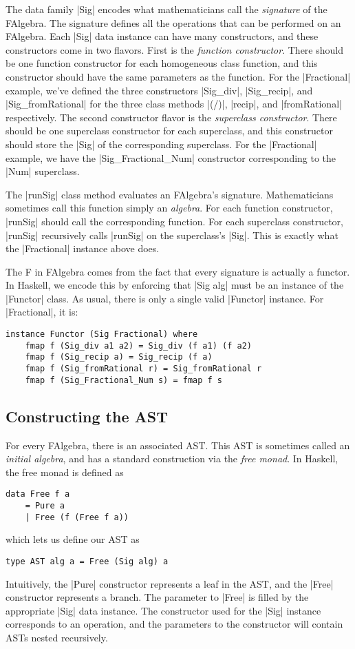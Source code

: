 \documentclass[preprint]{sigplanconf}
\theoremstyle{definition}
\begin{document}
The data family |Sig| encodes what mathematicians call the \emph{signature} of the FAlgebra.
The signature defines all the operations that can be performed on an FAlgebra.
Each |Sig| data instance can have many constructors,
and these constructors come in two flavors.
First is the \emph{function constructor}.
There should be one function constructor for each homogeneous class function, and
this constructor should have the same parameters as the function.
For the |Fractional| example, we've defined the three constructors |Sig_div|, |Sig_recip|, and |Sig_fromRational| for the three class methods |(/)|, |recip|, and |fromRational| respectively.
The second constructor flavor is the \emph{superclass constructor}.
There should be one superclass constructor for each superclass, and
this constructor should store the |Sig| of the corresponding superclass.
For the |Fractional| example, we have the |Sig_Fractional_Num| constructor corresponding to the |Num| superclass.

The |runSig| class method evaluates an FAlgebra's signature.
Mathematicians sometimes call this function simply an \emph{algebra}.
For each function constructor, |runSig| should call the corresponding function.
For each superclass constructor, |runSig| recursively calls |runSig| on the superclass's |Sig|.
This is exactly what the |Fractional| instance above does.

The F in FAlgebra comes from the fact that every signature is actually a functor.
In Haskell, we encode this by enforcing that |Sig alg| must be an instance of the |Functor| class.
As usual, there is only a single valid |Functor| instance.
For |Fractional|, it is:
\begin{lstlisting}
instance Functor (Sig Fractional) where
    fmap f (Sig_div a1 a2) = Sig_div (f a1) (f a2)
    fmap f (Sig_recip a) = Sig_recip (f a)
    fmap f (Sig_fromRational r) = Sig_fromRational r
    fmap f (Sig_Fractional_Num s) = fmap f s
\end{lstlisting}

\subsection{Constructing the AST}
\label{sec:hom.cons}

For every FAlgebra, there is an associated AST.
This AST is sometimes called an \emph{initial algebra},
and has a standard construction via the \emph{free monad}.
In Haskell, the free monad is defined as
\begin{lstlisting}
data Free f a
    = Pure a
    | Free (f (Free f a))
\end{lstlisting}
which lets us define our AST as
\begin{lstlisting}
type AST alg a = Free (Sig alg) a
\end{lstlisting}
Intuitively,
the |Pure| constructor represents a leaf in the AST,
and the |Free| constructor represents a branch.
The parameter to |Free| is filled by the appropriate |Sig| data instance.
The constructor used for the |Sig| instance corresponds to an operation,
and the parameters to the constructor will contain ASTs nested recursively.
\end{document}
